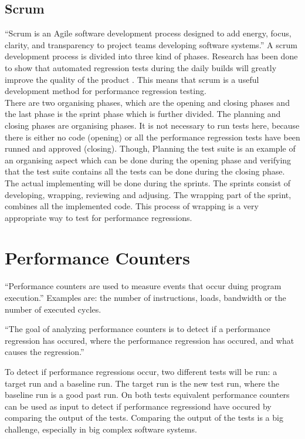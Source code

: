 \subsection{Scrum}
``Scrum is an Agile software development process designed to add energy, focus, clarity, and transparency to project teams developing software systems.''\cite{sutherland2007distributed} A scrum development process is divided into three kind of phases. Research has been done to show that automated regression tests during the daily builds will greatly improve the quality of the product \cite{Future_of_Scrum}. This means that scrum is a useful development method for performance regression testing. \\ There are two organising phases, which are the opening and closing phases and the last phase is the sprint phase which is further divided. The planning and closing phases are organising phases. It is not necessary to run tests here, because there is either no code (opening) or all the performance regression tests have been runned and approved (closing). Though, Planning the test suite is an example of an organising aspect which can be done during the opening phase and verifying that the test suite contains all the tests can be done during the closing phase. \\ The actual implementing will be done during the sprints. The sprints consist of developing, wrapping, reviewing and adjusing. The wrapping part of the sprint, combines all the implemented code. This process of wrapping is a very appropriate way to test for performance regressions.

\section{Performance Counters}``Performance counters are used to measure events that occur duing program execution.''\cite{PC} Examples are: the number of instructions, loads, bandwidth or the number of executed cycles.

``The goal of analyzing performance counters is to detect if a performance regression has occured, where the performance regression has occured, and what causes the regression.'' \cite{nguyen2012using}

To detect if performance regressions occur, two different tests will be run: a target run and a baseline run. The target run is the new test run, where the baseline run is a good past run. On both tests equivalent performance counters can be used as input to detect if performance regressiond have occured by comparing the output of the tests. Comparing the output of the tests is a big challenge, especially in big complex software systems.

